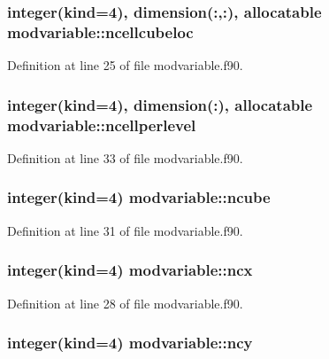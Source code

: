 \hypertarget{classmodvariable_ac90972e5c9f0aa13073f9f1f6f9cf879}{
\subsubsection[{ncellcubeloc}]{\setlength{\rightskip}{0pt plus 5cm}integer(kind=4), dimension(\-:,\-:), allocatable modvariable\-::ncellcubeloc}}\label{classmodvariable_ac90972e5c9f0aa13073f9f1f6f9cf879}


Definition at line 25 of file modvariable.\-f90.

\hypertarget{classmodvariable_ab27c6baa1a2f6fe45974edb46a27bd93}{
\subsubsection[{ncellperlevel}]{\setlength{\rightskip}{0pt plus 5cm}integer(kind=4), dimension(\-:), allocatable modvariable\-::ncellperlevel}}\label{classmodvariable_ab27c6baa1a2f6fe45974edb46a27bd93}


Definition at line 33 of file modvariable.\-f90.

\hypertarget{classmodvariable_a718efb76ffcda6b833e85642669fd01e}{
\subsubsection[{ncube}]{\setlength{\rightskip}{0pt plus 5cm}integer(kind=4) modvariable\-::ncube}}\label{classmodvariable_a718efb76ffcda6b833e85642669fd01e}


Definition at line 31 of file modvariable.\-f90.

\hypertarget{classmodvariable_af74891a7a77b7407b68129d1e9778f21}{
\subsubsection[{ncx}]{\setlength{\rightskip}{0pt plus 5cm}integer(kind=4) modvariable\-::ncx}}\label{classmodvariable_af74891a7a77b7407b68129d1e9778f21}


Definition at line 28 of file modvariable.\-f90.

\hypertarget{classmodvariable_ac9a317ff189f6a3f0bac9df49e622027}{
\subsubsection[{ncy}]{\setlength{\rightskip}{0pt plus 5cm}integer(kind=4) modvariable\-::ncy}}\label{classmodvariable_ac9a317ff189f6a3f0bac9df49e622027}


